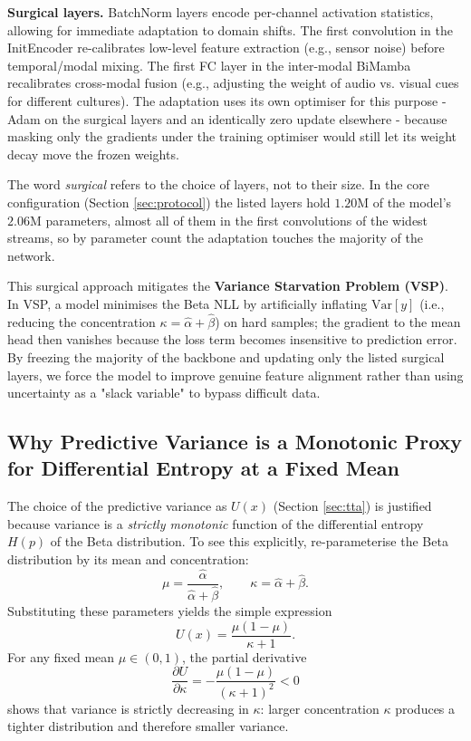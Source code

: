 \documentclass[10pt,a4paper,twocolumn]{article}
\begin{document}
	\textbf{Surgical layers.} BatchNorm layers encode per-channel activation statistics, allowing for immediate adaptation to domain shifts. The first convolution in the InitEncoder re-calibrates low-level feature extraction (e.g., sensor noise) before temporal/modal mixing. The first FC layer in the inter-modal BiMamba recalibrates cross-modal fusion (e.g., adjusting the weight of audio vs. visual cues for different cultures). The adaptation uses its own optimiser for this purpose - Adam on the surgical layers and an identically zero update elsewhere - because masking only the gradients under the training optimiser would still let its weight decay move the frozen weights.

	The word \emph{surgical} refers to the choice of layers, not to their size. In the core configuration (Section \ref{sec:protocol}) the listed layers hold $1.20$M of the model's $2.06$M parameters, almost all of them in the first convolutions of the widest streams, so by parameter count the adaptation touches the majority of the network.

	This surgical approach mitigates the \textbf{Variance Starvation Problem (VSP)}. In VSP, a model minimises the Beta NLL by artificially inflating $\mathrm{Var}[y]$ (i.e., reducing the concentration $\kappa = \hat{\alpha}+\hat{\beta}$) on hard samples; the gradient to the mean head then vanishes because the loss term becomes insensitive to prediction error. By freezing the majority of the backbone and updating only the listed surgical layers, we force the model to improve genuine feature alignment rather than using uncertainty as a "slack variable" to bypass difficult data.

	\subsection*{Why Predictive Variance is a Monotonic Proxy for Differential Entropy at a Fixed Mean}
	\label{app:varproxy}
	
	The choice of the predictive variance as $U(x)$ (Section \ref{sec:tta}) is justified because variance is a \emph{strictly monotonic} function of the differential entropy $H(p)$ of the Beta distribution.  
	To see this explicitly, re-parameterise the Beta distribution by its mean and concentration:
	$$
	\mu = \frac{\hat{\alpha}}{\hat{\alpha}+\hat{\beta}}, \qquad \kappa = \hat{\alpha} + \hat{\beta}.
	$$
	Substituting these parameters yields the simple expression
	$$
	U(x) = \frac{\mu(1-\mu)}{\kappa + 1}.
	$$
	For any fixed mean $\mu \in (0,1)$, the partial derivative
	$$
	\frac{\partial U}{\partial \kappa} = -\frac{\mu(1-\mu)}{(\kappa+1)^2} < 0
	$$
	shows that variance is strictly decreasing in $\kappa$: larger concentration $\kappa$ produces a tighter distribution and therefore smaller variance.
	
\end{document}
